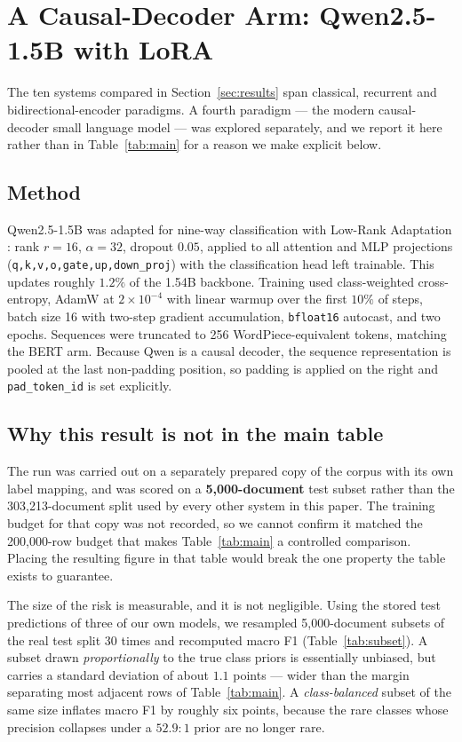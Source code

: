 \section{A Causal-Decoder Arm: Qwen2.5-1.5B with LoRA}
\label{sec:qwen}

The ten systems compared in Section~\ref{sec:results} span classical, recurrent
and bidirectional-encoder paradigms. A fourth paradigm --- the modern
causal-decoder small language model --- was explored separately, and we report
it here rather than in Table~\ref{tab:main} for a reason we make explicit below.

\subsection{Method}

Qwen2.5-1.5B \cite{yang2024qwen2} was adapted for nine-way classification with
Low-Rank Adaptation \cite{hu2021lora}: rank $r=16$, $\alpha=32$, dropout $0.05$,
applied to all attention and MLP projections
(\texttt{q,k,v,o,gate,up,down\_proj}) with the classification head left
trainable. This updates roughly $1.2\%$ of the 1.54B backbone. Training used
class-weighted cross-entropy, AdamW at $2\times10^{-4}$ with linear warmup over
the first $10\%$ of steps, batch size 16 with two-step gradient accumulation,
\texttt{bfloat16} autocast, and two epochs. Sequences were truncated to 256
WordPiece-equivalent tokens, matching the BERT arm. Because Qwen is a causal
decoder, the sequence representation is pooled at the last non-padding position,
so padding is applied on the right and \texttt{pad\_token\_id} is set explicitly.

\subsection{Why this result is not in the main table}

The run was carried out on a separately prepared copy of the corpus with its own
label mapping, and was scored on a \textbf{5,000-document} test subset rather
than the 303,213-document split used by every other system in this paper. The
training budget for that copy was not recorded, so we cannot confirm it matched
the 200,000-row budget that makes Table~\ref{tab:main} a controlled comparison.
Placing the resulting figure in that table would break the one property the
table exists to guarantee.

The size of the risk is measurable, and it is not negligible. Using the stored
test predictions of three of our own models, we resampled 5,000-document subsets
of the real test split 30 times and recomputed macro F1 (Table~\ref{tab:subset}).
A subset drawn \emph{proportionally} to the true class priors is essentially
unbiased, but carries a standard deviation of about $1.1$ points --- wider than
the margin separating most adjacent rows of Table~\ref{tab:main}. A
\emph{class-balanced} subset of the same size inflates macro F1 by roughly six
points, because the rare classes whose precision collapses under a $52.9{:}1$
prior are no longer rare.

